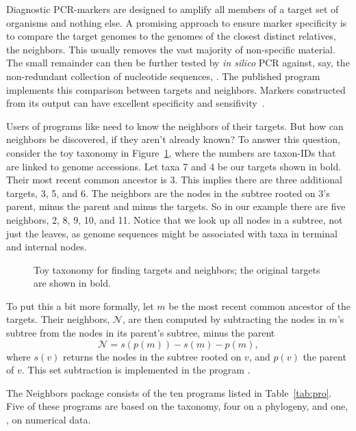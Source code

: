 Diagnostic PCR-markers are designed to amplify all members of a target
set of organisms and nothing else. A promising approach to ensure
marker specificity is to compare the target genomes to the genomes of
the closest distinct relatives, the neighbors. This usually removes
the vast majority of non-specific material. The small remainder can
then be further tested by \emph{in silico} PCR against, say, the
non-redundant collection of nucleotide sequences, . The
published program  implements this comparison between targets
and neighbors. Markers constructed from its output can have excellent
specificity and sensifivity~\cite{hau21:fur}.

Users of programs like  need to know the neighbors of their
targets. But how can neighbors be discovered, if they aren't already
known? To answer this question, consider the toy taxonomy in
Figure~\ref{fig:tax}, where the numbers are taxon-IDs that are linked
to genome accessions. Let taxa 7 and 4 be our targets shown in
bold. Their most recent common ancestor is 3. This implies there are
three additional targets, 3, 5, and 6. The neighbors are the nodes in
the subtree rooted on 3's parent, minus the parent and minus the
targets. So in our example there are five neighbors, 2, 8, 9, 10, and
11. Notice that we look up all nodes in a subtree, not just the
leaves, as genome sequences might be associated with taxa in terminal
and internal nodes.

\begin{figure}
\begin{center}

\end{center}
\caption{Toy taxonomy for finding targets and neighbors; the original
targets are shown in bold.}\label{fig:tax}
\end{figure}

To put this a bit more formally, let $m$ be the most recent common
ancestor of the targets. Their neighbors, $\mathcal{N}$, are then
computed by subtracting the nodes in $m$'s subtree from the nodes in
its parent's subtree, minus the parent
\begin{equation}\label{eq:nei}
\mathcal{N} = s(p(m)) - s(m) - p(m),
\end{equation}
where $s(v)$ returns the nodes in the subtree rooted on $v$, and
$p(v)$ the parent of $v$. This set subtraction is implemented in the
program .

The Neighbors package consists of the ten programs listed in
Table~\ref{tab:pro}. Five of these programs are based on the taxonomy,
four on a phylogeny, and one, , on numerical data.

